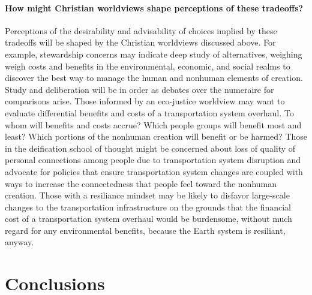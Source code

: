 \documentclass[12pt]{article}
\begin{document}
\paragraph{How might Christian worldviews shape perceptions of these tradeoffs?} 

Perceptions of the desirability and advisability of choices implied by these tradeoffs 
will be shaped by the Christian worldviews discussed above.
For example, stewardship concerns may indicate deep study of alternatives, 
weighing weigh costs and benefits in the environmental, economic, and social realms
to discover the best way to manage the human and nonhuman elements of creation.
Study and deliberation will be in order as debates over the numeraire for comparisons arise.
Those informed by an eco-justice worldview may want to evaluate 
differential benefits and costs of a transportation system overhaul.
To whom will benefits and costs accrue? 
Which people groups will benefit most and least? 
Which portions of the nonhuman creation will benefit or be harmed? 
Those in the deification school of thought might be concerned 
about loss of quality of personal connections 
among people due to transportation system disruption
and advocate for policies that ensure transportation system changes 
are coupled with ways to increase the connectedness that people
feel toward the nonhuman creation.
Those with a resiliance mindset may be likely to disfavor 
large-scale changes to the transportation infrastructure 
on the grounds that the financial cost of a transportation system overhaul would be burdensome,
without much regard for any environmental benefits, 
because the Earth system is resiliant, anyway.







\section{Conclusions}
\label{sec:conclusions}

\end{document}
